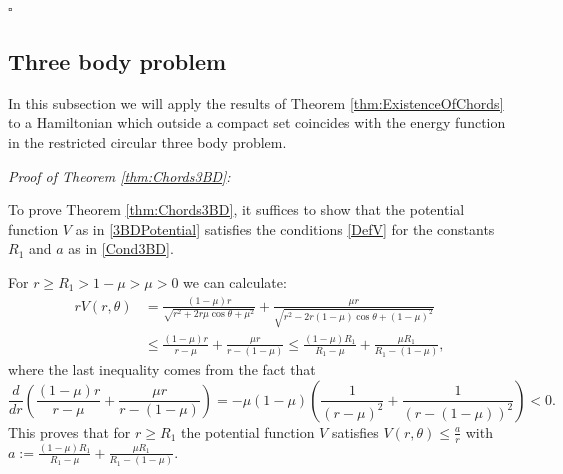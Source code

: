 \documentclass[a4paper]{amsart}
\numberwithin{equation}{section}
\begin{document}
\hfill $\square$

\subsection{Three body problem} In this subsection we will apply the results of Theorem \ref{thm:ExistenceOfChords} to a Hamiltonian which outside a compact set coincides with the energy function in the restricted circular three body problem.

\noindent\textit{Proof of Theorem \ref{thm:Chords3BD}:}

To prove Theorem \ref{thm:Chords3BD}, it suffices to show that 
the potential function $V$ as in \eqref{3BDPotential} satisfies the conditions \eqref{DefV} for the constants $R_1$ and $a$ as in \eqref{Cond3BD}.

For $r\geq R_1>1-\mu>\mu>0$ we can calculate:
\begin{align*}
r V(r,\theta) & = \frac{(1-\mu)r}{\sqrt{r^2+2r\mu \cos \theta +\mu^2}}+\frac{\mu r}{\sqrt{r^2-2r(1-\mu) \cos \theta +(1-\mu)^2}}\\
& \leq \frac{(1-\mu)r}{r-\mu}+\frac{\mu r}{r- (1-\mu)} \leq \frac{(1-\mu)R_1}{R_1-\mu}+\frac{\mu R_1}{R_1- (1-\mu)},
\end{align*}
where the last inequality comes from the fact that
$$
\frac{d}{dr}\left( \frac{(1-\mu)r}{r-\mu}+\frac{\mu r}{r- (1-\mu)}\right) = -\mu(1-\mu)\left(\frac{1}{(r-\mu)^2} + \frac{1}{(r-(1-\mu))^2}\right)<0.
$$
This proves that for $r\geq R_1$ the potential function $V$ satisfies $V(r,\theta) \leq \frac{a}{r}$ with\linebreak $a:=\frac{(1-\mu)R_1}{R_1-\mu}+\frac{\mu R_1}{R_1- (1-\mu)}$.
\end{document}
